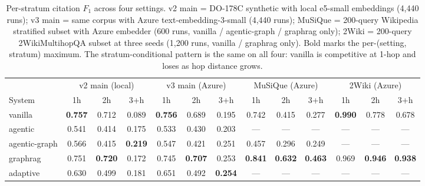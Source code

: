 \begin{table}[t]
  \centering
  \caption{Per-stratum citation $F_1$ across four settings. v2 main = DO-178C synthetic with local e5-small embeddings (4{,}440 runs); v3 main = same corpus with Azure text-embedding-3-small (4{,}440 runs); MuSiQue = 200-query Wikipedia stratified subset with Azure embedder (600 runs, vanilla / agentic-graph / graphrag only); 2Wiki = 200-query 2WikiMultihopQA subset at three seeds (1{,}200 runs, vanilla / graphrag only). Bold marks the per-(setting, stratum) maximum. The stratum-conditional pattern is the same on all four: vanilla is competitive at 1-hop and loses as hop distance grows.}
  \label{tab:dominance}
  \footnotesize\setlength{\tabcolsep}{3pt}
  \begin{tabular}{l ccc | ccc | ccc | ccc}
    \toprule
     & \multicolumn{3}{c|}{v2 main (local)} & \multicolumn{3}{c|}{v3 main (Azure)} & \multicolumn{3}{c|}{MuSiQue (Azure)} & \multicolumn{3}{c}{2Wiki (Azure)} \\
    System & 1h & 2h & 3+h & 1h & 2h & 3+h & 1h & 2h & 3+h & 1h & 2h & 3+h \\
    \midrule
    vanilla & \textbf{0.757} & 0.712 & 0.089 & \textbf{0.756} & 0.689 & 0.195 & 0.742 & 0.415 & 0.277 & \textbf{0.990} & 0.778 & 0.678 \\
    agentic & 0.541 & 0.414 & 0.175 & 0.533 & 0.430 & 0.203 & --- & --- & --- & --- & --- & --- \\
    agentic-graph & 0.566 & 0.415 & \textbf{0.219} & 0.547 & 0.421 & 0.251 & 0.457 & 0.296 & 0.249 & --- & --- & --- \\
    graphrag & 0.751 & \textbf{0.720} & 0.172 & 0.745 & \textbf{0.707} & 0.253 & \textbf{0.841} & \textbf{0.632} & \textbf{0.463} & 0.969 & \textbf{0.946} & \textbf{0.938} \\
    adaptive & 0.630 & 0.499 & 0.181 & 0.651 & 0.492 & \textbf{0.254} & --- & --- & --- & --- & --- & --- \\
    \bottomrule
  \end{tabular}
\end{table}
